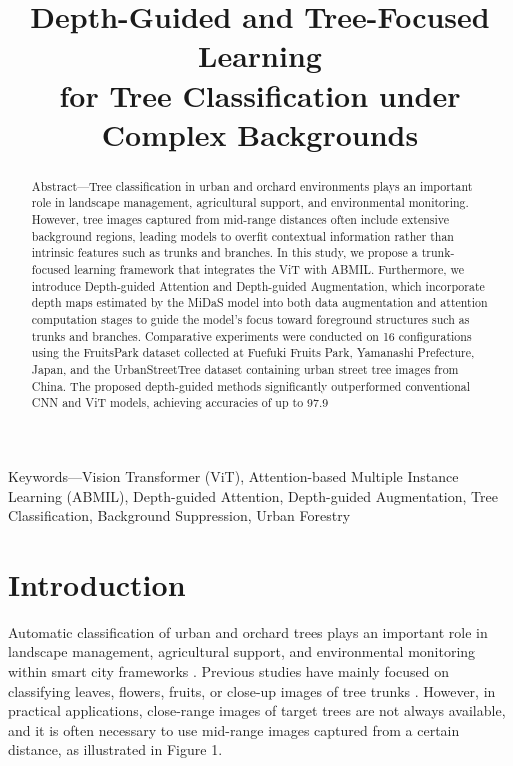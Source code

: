 \documentclass{article}
\title{Depth-Guided and Tree-Focused Learning \\ for Tree Classification under Complex Backgrounds}
\begin{document}
\maketitle

\begin{abstract}
Abstract—Tree classification in urban and orchard environments plays an important role in landscape management, agricultural support, and environmental monitoring. However, tree images captured from mid-range distances often include extensive background regions, leading models to overfit contextual information rather than intrinsic features such as trunks and branches. In this study, we propose a trunk-focused learning framework that integrates the ViT with ABMIL. Furthermore, we introduce Depth-guided Attention and Depth-guided Augmentation, which incorporate depth maps estimated by the MiDaS model into both data augmentation and attention computation stages to guide the model’s focus toward foreground structures such as trunks and branches. Comparative experiments were conducted on 16 configurations using the FruitsPark dataset collected at Fuefuki Fruits Park, Yamanashi Prefecture, Japan, and the UrbanStreetTree dataset containing urban street tree images from China. The proposed depth-guided methods significantly outperformed conventional CNN and ViT models, achieving accuracies of up to 97.9%
\end{abstract}

\begin{keywords}
Keywords—Vision Transformer (ViT), Attention-based Multiple Instance Learning (ABMIL), Depth-guided Attention, Depth-guided Augmentation, Tree Classification, Background Suppression, Urban Forestry
\end{keywords}

\section{Introduction}
Automatic classification of urban and orchard trees plays an important role in landscape management, agricultural support, and environmental monitoring within smart city frameworks \cite{ref4,ref5,ref6,ref7}. Previous studies have mainly focused on classifying leaves, flowers, fruits, or close-up images of tree trunks \cite{ref5,ref6,ref7,ref9,ref10}. However, in practical applications, close-range images of target trees are not always available, and it is often necessary to use mid-range images captured from a certain distance, as illustrated in Figure 1.
\end{document}

